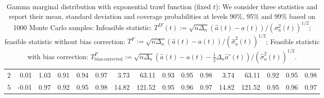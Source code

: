 \documentclass{article}
\theoremstyle{plain}
\theoremstyle{definition}
\theoremstyle{remark}
\begin{document}
\begin{appendix}
{\begin{table}[ht]
\begin{tabular}{r|rrrrr|rrrrr|rrrrr}
  2 & 0.01 & 1.03 & 0.91 & 0.94 & 0.97 & 3.73 & 63.11 & 0.93 & 0.95 & 0.98 & 3.74 & 63.11 & 0.92 & 0.95 & 0.98 \\ 
  5 & -0.01 & 0.97 & 0.92 & 0.95 & 0.98 & 14.82 & 121.52 & 0.95 & 0.96 & 0.97 & 14.82 & 121.52 & 0.95 & 0.96 & 0.97 \\ 
   \bottomrule
\end{tabular}
\caption{ \label{tab:Gamma-Exp-fixedt} Gamma marginal distribution with exponential trawl function (fixed $t$): We consider three statistics and report their mean, standard deviation and coverage probabilities at levels 90\%, 95\% and 99\% based on 1000 Monte Carlo samples:
Infeasible statistic:
	$T^{IF}(t):=\sqrt{n\Delta_{n}}\left(\hat{a}(t)-a(t)\right)/(\sigma_a^2(t))^{1/2}$; feasible statistic without bias correction:
	$T^{F}:=\sqrt{n\Delta_{n}}\left(\hat{a}(t)-a(t)\right)/(\hat \sigma_a^2(t))^{1/2}$; Feasible statistic with bias correction:
	$T^{F}_{\mathrm{bias \, corrected}}:=\sqrt{n\Delta_{n}}\left(\hat{a}(t)-a(t)-\frac{1}{2}\Delta_n \hat a'(t)\right)/(\hat \sigma_a^2(t))^{1/2}$.}
\end{table}
	
}



\end{appendix}
\end{document}
